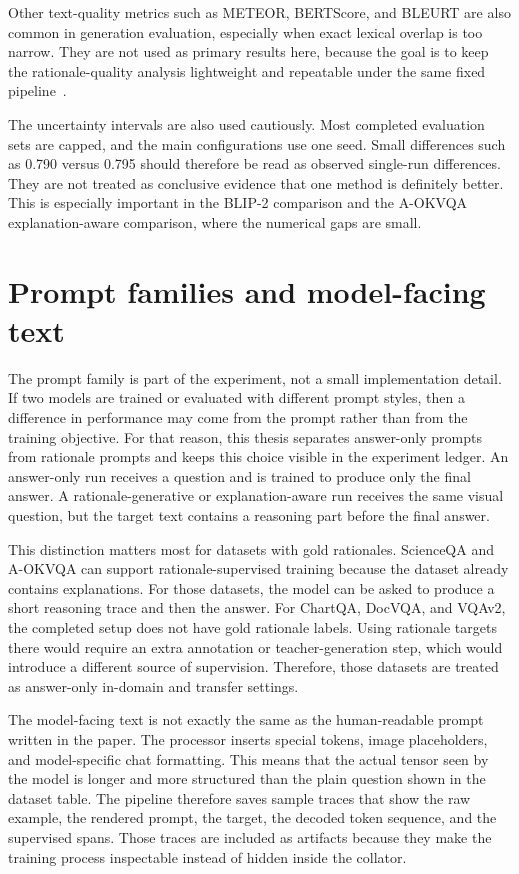 Other text-quality metrics such as METEOR, BERTScore, and BLEURT are also common in generation evaluation,
especially when exact lexical overlap is too narrow.
They are not used as primary results here, because the goal is to keep the rationale-quality analysis lightweight and repeatable under the same fixed pipeline~\cite{banerjee2005meteor,zhang2020bertscore,sellam2020bleurt}.

The uncertainty intervals are also used cautiously.
Most completed evaluation sets are capped, and the main configurations use one seed.
Small differences such as 0.790 versus 0.795 should therefore be read as observed single-run differences.
They are not treated as conclusive evidence that one method is definitely better.
This is especially important in the BLIP-2 comparison and the A-OKVQA explanation-aware comparison, where the numerical gaps are small.

\section{Prompt families and model-facing text}
The prompt family is part of the experiment, not a small implementation detail.
If two models are trained or evaluated with different prompt styles, then a difference in performance may come from the prompt rather than from the training objective.
For that reason, this thesis separates answer-only prompts from rationale prompts and keeps this choice visible in the experiment ledger.
An answer-only run receives a question and is trained to produce only the final answer.
A rationale-generative or explanation-aware run receives the same visual question, but the target text contains a reasoning part before the final answer.

This distinction matters most for datasets with gold rationales.
ScienceQA and A-OKVQA can support rationale-supervised training because the dataset already contains explanations.
For those datasets, the model can be asked to produce a short reasoning trace and then the answer.
For ChartQA, DocVQA, and VQAv2, the completed setup does not have gold rationale labels.
Using rationale targets there would require an extra annotation or teacher-generation step, which would introduce a different source of supervision.
Therefore, those datasets are treated as answer-only in-domain and transfer settings.

The model-facing text is not exactly the same as the human-readable prompt written in the paper.
The processor inserts special tokens, image placeholders, and model-specific chat formatting.
This means that the actual tensor seen by the model is longer and more structured than the plain question shown in the dataset table.
The pipeline therefore saves sample traces that show the raw example, the rendered prompt, the target, the decoded token sequence, and the supervised spans.
Those traces are included as artifacts because they make the training process inspectable instead of hidden inside the collator.

